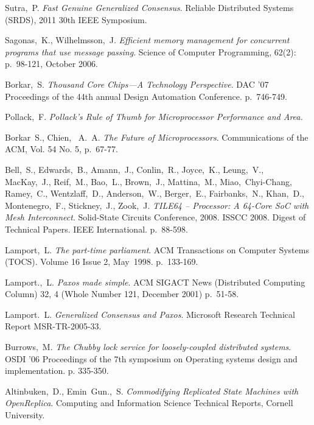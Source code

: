 \documentclass[english,11pt]{l4proj}
\begin{document}
\clearpage
\begin{thebibliography}{99}

     Sutra,~P. \emph{Fast Genuine Generalized Consensus}. Reliable
        Distributed Systems (SRDS), 2011 30th IEEE Symposium.

     Sagonas,~K., Wilhelmsson,~J. \emph{Efficient memory
        management for concurrent programs that use message passing}. Science of
        Computer Programming, 62(2): p.~98-121, October 2006.

     Borkar,~S. \emph{Thousand Core Chips—A Technology
        Perspective}. DAC '07 Proceedings of the 44th annual Design Automation
        Conference. p.~746-749.

     Pollack,~F. \emph{Pollack's Rule of Thumb for
        Microprocessor Performance and Area.}

     Borkar~S., Chien,~ A.~A. \emph{The Future
        of Microprocessors}. Communications of the ACM, Vol. 54 No. 5, p.~67-77.

     Bell,~S., Edwards,~B., Amann,~J., Conlin,~R.,
        Joyce,~K., Leung,~V., MacKay,~J., Reif,~M., Bao,~L., Brown,~J.,
        Mattina,~M., Miao,~Chyi-Chang, Ramey,~C., Wentzlaff,~D.,
        Anderson,~W., Berger,~E., Fairbanks,~N., Khan,~D., Montenegro,~F.,
        Stickney,~J., Zook,~J. \emph{TILE64 -- Processor: A 64-Core SoC with
        Mesh Interconnect}. Solid-State Circuits Conference, 2008. ISSCC 2008.
        Digest of Technical Papers. IEEE International. p.~88-598.

     Lamport,~L. \emph{The part-time parliament}. ACM
        Transactions on Computer Systems (TOCS). Volume 16 Issue 2, May~1998.
        p.~133-169.

     Lamport.,~L. \emph{Paxos made simple}. ACM SIGACT
        News (Distributed Computing Column) 32, 4 (Whole Number 121, December
        2001) p.~51-58.

     Lamport.~L. \emph{Generalized Consensus and
        Paxos}. Microsoft Research Technical Report MSR-TR-2005-33.

     Burrows,~M. \emph{The Chubby lock service for
        loosely-coupled distributed systems}. OSDI '06 Proceedings of the 7th
        symposium on Operating systems design and implementation. p. 335-350.

     Altinbuken,~D., Emin~Gun.,~S. \emph{Commodifying
        Replicated State Machines with OpenReplica}. Computing and
        Information Science Technical Reports, Cornell University.


\end{thebibliography}
\end{document}
